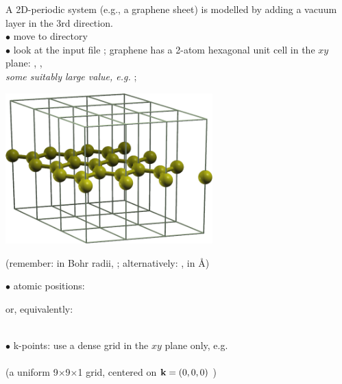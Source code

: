 \documentclass[landscape]{foils}
\begin{document}
%
\parbox{17cm}{A 2D-periodic system (e.g., a graphene sheet) is
  modelled by adding a vacuum layer in the 3rd direction.\\[-0.5em]

  $\bullet$ move to  directory\\[-0.5em]
  
  $\bullet$ look at the input file ;
  graphene has a 2-atom hexagonal unit cell in the $xy$ plane:
  , ,\\
  \textit{some suitably large value, e.g.} ;
}
\hfill \parbox{8cm}{
  \includegraphics[width=8cm]{figs/graphene.png}\\
}

{\small (remember:  in Bohr radii, ;
  alternatively: ,  in \AA)}

\parbox{12cm}{
  $\bullet$  atomic positions:\\
}
\hskip 2cm
\parbox{12cm}{
  or, equivalently:\\
}\\

$\bullet$ k-points: use a dense grid in the $xy$ plane only, e.g.\\
\\
(a uniform 9$\times$9$\times$1 grid, centered on ${\bf k}=(0,0,0)$ )
\end{document}
